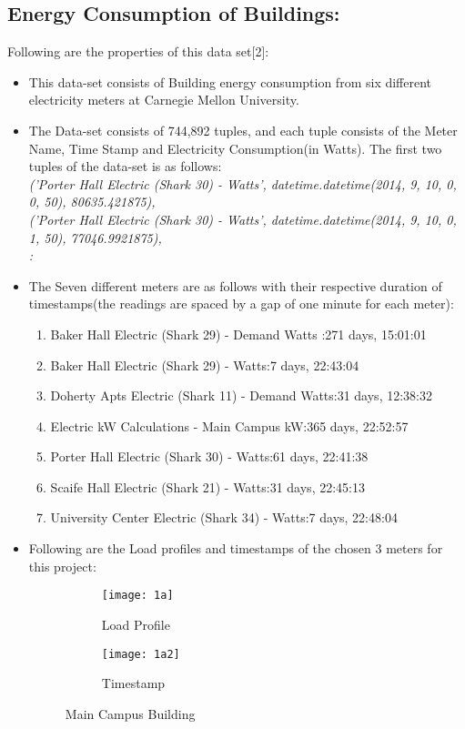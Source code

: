 \documentclass[a4paper,11pt]{article}
\begin{document}
\subsection{ Energy Consumption of Buildings:}
Following are the properties of this data set[2]:
\begin{itemize}
\itemsep0em
\item This data-set consists of Building energy consumption from six different electricity meters at Carnegie Mellon University.
\item The Data-set consists of 744,892 tuples, and each tuple consists of the Meter Name, Time Stamp and Electricity Consumption(in Watts). The first two tuples of the data-set is as follows:\\
\emph{('Porter Hall Electric (Shark 30) - Watts', datetime.datetime(2014, 9, 10, 0, 0, 50), 80635.421875),\\('Porter Hall Electric (Shark 30) - Watts', datetime.datetime(2014, 9, 10, 0, 1, 50), 77046.9921875),\\:}
\item The Seven different meters are as follows with their respective duration of timestamps(the readings are spaced by a gap of one minute for each meter):
\begin{enumerate}
\itemsep0em
\item Baker Hall Electric (Shark 29) - Demand Watts :271 days, 15:01:01
\item Baker Hall Electric (Shark 29) - Watts:7 days, 22:43:04
\item Doherty Apts Electric (Shark 11) - Demand Watts:31 days, 12:38:32
\item Electric kW Calculations - Main Campus kW:365 days, 22:52:57
\item Porter Hall Electric (Shark 30) - Watts:61 days, 22:41:38
\item Scaife Hall Electric (Shark 21) - Watts:31 days, 22:45:13
\item University Center Electric (Shark 34) - Watts:7 days, 22:48:04
\end{enumerate}
\item Following are the Load profiles and timestamps of the chosen 3
meters for this project:
\begin{figure}[H]
        \centering
        \begin{subfigure}[b]{0.4\textwidth}
                \texttt{[image: 1a]}
                \caption{Load Profile }
                \label{fig:Load 1}
        \end{subfigure}%
\hfill
        \begin{subfigure}[b]{0.3\textwidth}
                \texttt{[image: 1a2]}
                \caption{Timestamp}
                \label{fig:tiger}
        \end{subfigure}
        \caption{Main Campus Building}\label{fig:animals}
\end{figure}


\end{itemize}
\end{document}
